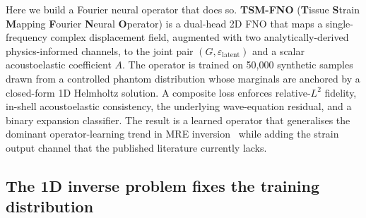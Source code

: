 \documentclass[11pt,letterpaper]{article}
\newcommand{\eps}{\varepsilon}
\newcommand{\epslat}{\eps_{\mathrm{latent}}}
\begin{document}
Here we build a Fourier neural operator that does so. \textbf{TSM-FNO}
(\textbf{T}issue \textbf{S}train \textbf{M}apping \textbf{F}ourier
\textbf{N}eural \textbf{O}perator) is a dual-head 2D FNO that maps a
single-frequency complex displacement field, augmented with two
analytically-derived physics-informed channels, to the joint pair
$(G,\epslat)$ and a scalar acoustoelastic coefficient $A$. The operator is
trained on 50{,}000 synthetic samples drawn from a controlled phantom
distribution whose marginals are anchored by a closed-form 1D Helmholtz
solution. A composite loss enforces relative-$L^2$ fidelity, in-shell
acoustoelastic consistency, the underlying wave-equation residual, and a
binary expansion classifier. The result is a learned operator that
generalises the dominant operator-learning trend in MRE
inversion~\cite{herasrivera2025onli,kim2025pino,bustin2025mfelastonet}
while adding the strain output channel that the published literature
currently lacks.

\subsection*{The 1D inverse problem fixes the training distribution}
\end{document}
